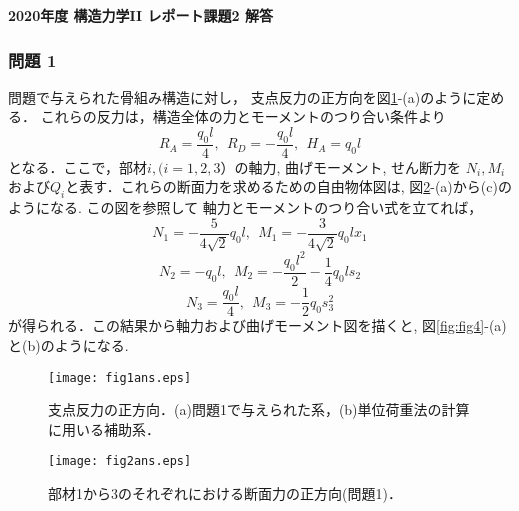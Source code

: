\documentclass[10pt,a4j]{jarticle}
\newlength{\minitwocolumn}
\begin{document}
\newcommand{\fat}[1]{\mbox{\boldmath $#1$}}
\newcommand{\D}{\partial}
\newcommand{\w}{\omega}
\newcommand{\ga}{\alpha}
\newcommand{\gb}{\beta}
\newcommand{\gx}{\xi}
\newcommand{\gz}{\zeta}
\newcommand{\vhat}[1]{\hat{\fat{#1}}}
\newcommand{\spc}{\vspace{0.7\baselineskip}}
\newcommand{\halfspc}{\vspace{0.3\baselineskip}}

\pagestyle{empty}
\newcommand{\twofig}[2]
 {
   \begin{figure}[h]
     \begin{minipage}[t]{\minitwocolumn}
         \begin{center}   #1
         \end{center}
     \end{minipage}
         \hspace{\columnsep}
     \begin{minipage}[t]{\minitwocolumn}
         \begin{center} #2
         \end{center}
     \end{minipage}
   \end{figure}
 }
\begin{center}
	{\Large \bf 2020年度 構造力学II レポート課題2 解答} \\
\end{center}
\subsubsection*{問題 1}
	問題で与えられた骨組み構造に対し， 支点反力の正方向を図\ref{fig:fig1}-(a)のように定める．
	これらの反力は，構造全体の力とモーメントのつり合い条件より
	\[
		R_A=\frac{q_0l}{4}, \ \ R_D=-\frac{q_0l}{4}, \ \ H_A=q_0l
	\]
	となる．ここで，部材$i, (i=1,2,3）$の軸力, 曲げモーメント, せん断力を
	$N_i, M_i$および$Q_i$と表す．これらの断面力を求めるための自由物体図は, 
	図\ref{fig:fig2}-(a)から(c)のようになる.
	この図を参照して 軸力とモーメントのつり合い式を立てれば，
	\[
		N_1=-\frac{5}{4\sqrt{2}}q_0l, \ \ 
		M_1=-\frac{3}{4\sqrt{2}}q_0lx_1
	\]
	\[
		N_2=-q_0l, \ \ 
		M_2=-\frac{q_0l^2}{2}-\frac{1}{4}q_0ls_2
	\]
	\[
		N_3=\frac{q_0l}{4}, \ \ 
		M_3=-\frac{1}{2}q_0s_3^2
	\]
	が得られる．この結果から軸力および曲げモーメント図を描くと, 
	図\ref{fig:fig4}-(a)と(b)のようになる.
\begin{figure}[h]
	\begin{center}
	\texttt{[image: fig1ans.eps]} 
	\end{center}
	\caption{支点反力の正方向．(a)問題1で与えられた系，(b)単位荷重法の計算に用いる補助系．} 
	\label{fig:fig1}
\end{figure}
\begin{figure}[h]
	\begin{center}
	\texttt{[image: fig2ans.eps]} 
	\end{center}
	\caption{部材1から3のそれぞれにおける断面力の正方向(問題1)．}
	\label{fig:fig2}
\end{figure}
\end{document}
